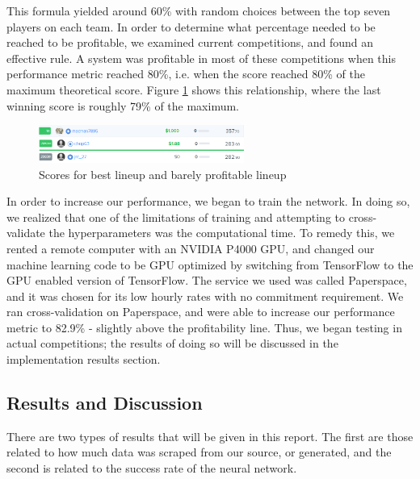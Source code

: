 This formula yielded around 60\% with random choices between the top seven players on each team. In order to determine what percentage needed to be reached to be profitable, we examined current competitions, and found an effective rule. A system was profitable in most of these competitions when this performance metric reached 80\%, i.e. when the score reached 80\% of the maximum theoretical score. Figure \ref{fig:80pRule} shows this relationship, where the last winning score is roughly 79\% of the maximum.
\begin{figure}[ht]
    \centering
    \includegraphics[width=0.6\textwidth]{figures/winningvslosing}
    \caption{Scores for best lineup and barely profitable lineup}
    \label{fig:80pRule}
\end{figure}
In order to increase our performance, we began to train the network. In doing so, we realized that one of the limitations of training and attempting to cross-validate the hyperparameters was the computational time. To remedy this, we rented a remote computer with an NVIDIA P4000 GPU, and changed our machine learning code to be GPU optimized by switching from TensorFlow to the GPU enabled version of TensorFlow. The service we used was called Paperspace, and it was chosen for its low hourly rates with no commitment requirement. We ran cross-validation on Paperspace, and were able to increase our performance metric to 82.9\% - slightly above the profitability line. Thus, we began testing in actual competitions; the results of doing so will be discussed in the implementation results section.

\subsection{Results and Discussion}
There are two types of results that will be given in this report. The first are those related to how much data was scraped from our source, or generated, and the second is related to the success rate of the neural network.

